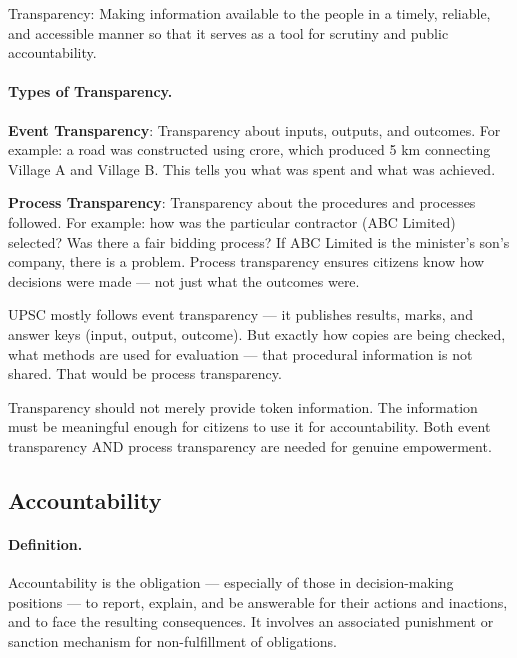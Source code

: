 \begin{KeyConcept}
Transparency: Making information available to the people in a timely, reliable, and accessible manner so that it serves as a tool for scrutiny and public accountability.
\end{KeyConcept}

\paragraph{Types of Transparency.} \textbf{Event Transparency}: Transparency about inputs, outputs, and outcomes. For example: a road was constructed using  crore, which produced 5 km connecting Village A and Village B. This tells you what was spent and what was achieved.

\textbf{Process Transparency}: Transparency about the procedures and processes followed. For example: how was the particular contractor (ABC Limited) selected? Was there a fair bidding process? If ABC Limited is the minister's son's company, there is a problem. Process transparency ensures citizens know how decisions were made --- not just what the outcomes were.

\begin{ExampleBox}
UPSC mostly follows event transparency --- it publishes results, marks, and answer keys (input, output, outcome). But exactly how copies are being checked, what methods are used for evaluation --- that procedural information is not shared. That would be process transparency.
\end{ExampleBox}

\begin{CriticalPoint}
Transparency should not merely provide token information. The information must be meaningful enough for citizens to use it for accountability. Both event transparency AND process transparency are needed for genuine empowerment.
\end{CriticalPoint}

\subsection{Accountability}

\paragraph{Definition.} Accountability is the obligation --- especially of those in decision-making positions --- to report, explain, and be answerable for their actions and inactions, and to face the resulting consequences. It involves an associated punishment or sanction mechanism for non-fulfillment of obligations.

